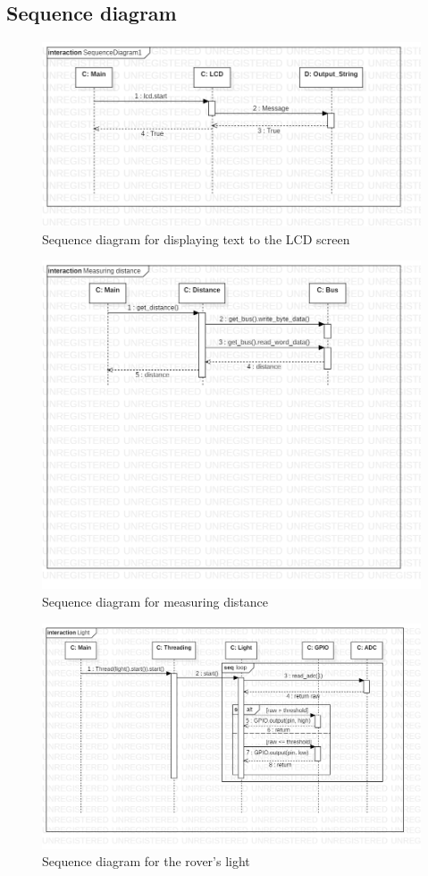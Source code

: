 \documentclass[12pt]{article}
\begin{document}
 	\subsection{Sequence diagram}
 	\begin{figure}[H]
 		\includegraphics[width=\linewidth]{SequenceDiagram1.png}
 		\caption{Sequence diagram for displaying text to the LCD screen}
 	\end{figure}
 	\begin{figure}[H]
 		\includegraphics[width=\linewidth]{SequenceDiagram2.png}
 		\caption{Sequence diagram for measuring distance}
 	\end{figure}
 	\begin{figure}[H]
 		\includegraphics[width=\linewidth]{SequenceDiagram3.png}
 		\caption{Sequence diagram for the rover's light}
 	\end{figure}
\end{document}
